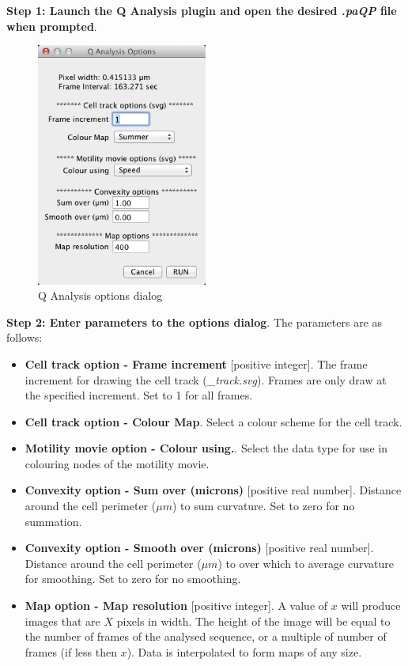 \documentclass[a4paper,12pt]{article}
\begin{document}
\textbf{Step 1: Launch the Q Analysis plugin and open the desired \textit{.paQP} file when prompted}.

\begin{figure}[ht]
   \centering
   \includegraphics[height=8cm]{screenQAnalysis.png} 
   \caption{Q Analysis options dialog}
   \label{screenQAnalysis}
\end{figure}

\textbf{Step 2: Enter parameters to the options dialog}.  The parameters are as follows:

\begin{itemize}

\item \textbf{Cell track option - Frame increment}  [positive integer].  The frame increment for drawing the
cell track (\textit{\_track.svg}).  Frames are only draw at the specified increment.  Set to 1 for all frames.  
\item \textbf{Cell track option - Colour Map}.  Select a colour scheme for the cell track.
\item \textbf{Motility movie option - Colour using.}. Select the data type for use in colouring nodes of the motility movie.
\item \textbf{Convexity option - Sum over (microns)} [positive real number].  Distance around the cell 
perimeter ($\mu m$) to sum curvature. Set to zero for no summation.
\item \textbf{Convexity option - Smooth over (microns)} [positive real number].  Distance around the cell 
perimeter ($\mu m$) to over which to average curvature for smoothing. Set to zero for no smoothing.
\item \textbf{Map option - Map resolution} [positive integer]. A value of $x$ will produce images that are
$X$ pixels in width.  The height of the image will be equal to the number of frames of the analysed sequence,
or a multiple of number of frames (if less then $x$). Data is interpolated to form maps of any size.
\end{itemize}
\end{document}
